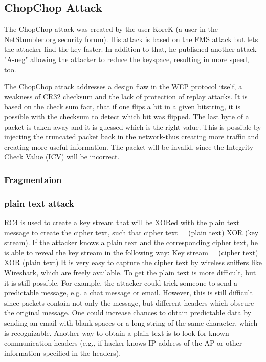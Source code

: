 \documentclass[a4paper,12pt,pagesize,headsepline,bibtotoc,titlepage]{scrartcl}
\begin{document}
\subsection{ChopChop Attack}

The ChopChop attack was created by the user KoreK (a user in the NetStumbler.org security forum). His attack is based on the FMS attack but lets the attacker find the key faster. In addition to that, he published another attack "A-neg" allowing the attacker to reduce the keyspace, resulting in more speed, too.

The ChopChop attack addresses a design flaw in the WEP protocol itself, a weakness of CR32 checksum and the lack of protection of replay attacks.
It is based on the check sum fact, that if one flips a bit in a given bitstring, it is possible with the checksum to detect which bit was flipped. 
The last byte of a packet is taken away and it is guessed which is the right value.
This is possible by injecting the truncated packet back in the network-thus creating more traffic and creating more useful information. The packet will be invalid, since the Integrity Check Value (ICV) will be incorrect.

\subsubsection{Fragmentaion }

\subsubsection{plain text attack}

RC4 is used to create a key stream that will be XORed with the plain text message to create the cipher text, such that
cipher text = (plain text) XOR (key stream).
If the attacker knows a plain text and the corresponding cipher text, he is able to reveal the key stream in the following way: 
 Key stream = (cipher text) XOR (plain text)
It is very easy to capture the cipher text by wireless sniffers like Wireshark, which are freely available.
To get the plain text is more difficult, but it is still possible. For example, the attacker could trick someone to send a predictable message, e.g. a chat message or email.
However, this is still difficult since packets contain not only the message, but different headers which obscure the original message.
One could increase chances to obtain predictable data by sending an
email with blank spaces or a long string of the same character, which is recognizable. 
Another way to obtain a plain text is to look for known
communication headers (e.g., if hacker knows IP address of the
AP or other information specified in the headers).
\end{document}
